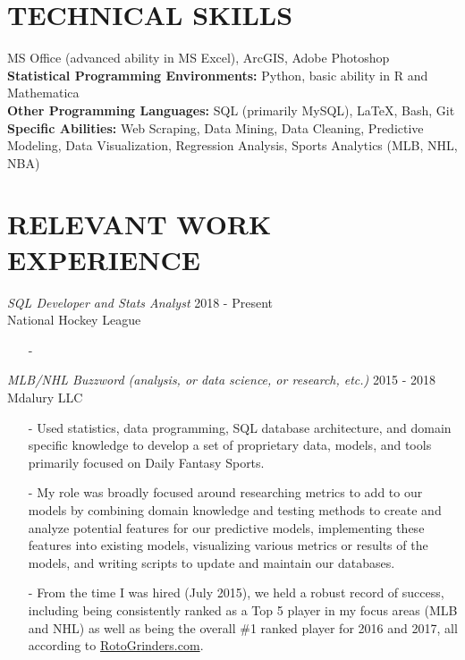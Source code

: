 \documentclass[margin]{res}
\begin{document}
\begin{resume}
\section{TECHNICAL SKILLS} 
\textbullet\hspace{3pt} MS Office (advanced ability in MS Excel), ArcGIS, Adobe Photoshop %
\\\textbullet\hspace{3pt} \textbf{Statistical Programming Environments:} Python, basic ability in R and Mathematica
\\\textbullet\hspace{3pt} \textbf{Other Programming Languages:} SQL (primarily MySQL), \LaTeX, Bash, Git %
\\\textbullet \hspace{3pt} \textbf{Specific Abilities:} Web Scraping, Data Mining, Data Cleaning, Predictive Modeling, Data Visualization, Regression Analysis, Sports Analytics (MLB, NHL, NBA)

\section{RELEVANT WORK EXPERIENCE}
\textit{SQL Developer and Stats Analyst} \hfill 2018 - Present
\\National Hockey League
\begin{itemize}
\item[-]
\end{itemize}

\textit{MLB/NHL Buzzword (analysis, or data science, or research, etc.)} \hfill 2015 - 2018
\\Mdalury LLC
\begin{itemize}
\item[-] Used statistics, data programming, SQL database architecture, and domain specific knowledge to develop a set of proprietary data, models, and tools primarily focused on Daily Fantasy Sports.
\item[-] My role was broadly focused around researching metrics to add to our models by combining domain knowledge and testing methods to create and analyze potential features for our predictive models, implementing these features into existing models, visualizing various metrics or results of the models, and writing scripts to update and maintain our databases.
\item[-] From the time I was hired (July 2015), we held a robust record of success, including being consistently ranked as a Top 5 player in my focus areas (MLB and NHL) as well as being the overall \#1 ranked player for 2016 and 2017, all according to \href{https://rotogrinders.com/profiles/saahilsud}{RotoGrinders.com}.
\end{itemize}


\end{resume}
\end{document}
